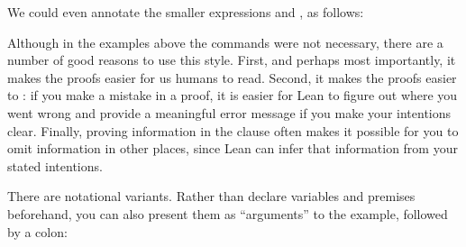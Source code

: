\documentclass[letterpaper,10pt,english]{sphinxmanual}
\begin{document}
\begin{sphinxVerbatim}[commandchars=\\\{\}]
           
       
          
\end{sphinxVerbatim}

\sphinxAtStartPar
We could even annotate the smaller expressions  and , as follows:

\begin{sphinxVerbatim}[commandchars=\\\{\}]
           
       
      
       
      
\end{sphinxVerbatim}

\sphinxAtStartPar
Although in the examples above the  commands were not necessary,
there are a number of good reasons to use this style.
First, and perhaps most importantly,
it makes the proofs easier for us humans to read.
Second, it makes the proofs easier to :
if you make a mistake in a proof,
it is easier for Lean to figure out where you went wrong and provide a
meaningful error message if you make your intentions clear.
Finally, proving information in the 
clause often makes it possible for you to omit information in other places,
since Lean can infer that information from your stated intentions.

\sphinxAtStartPar
There are notational variants.
Rather than declare variables and premises beforehand,
you can also present them as “arguments” to the example, followed by a colon:
\end{document}
